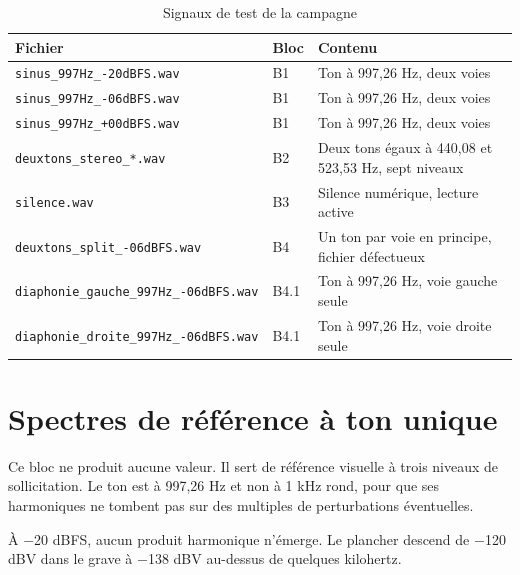 \begin{table}[H]
    \centering
    \caption{Signaux de test de la campagne}
    \label{tab:imd_signaux}
    \small
    \begin{tabular}{llp{}}
        \toprule
        Fichier                                        & Bloc & Contenu                                             \\
        \midrule
        \texttt{sinus\_997Hz\_-20dBFS.wav}             & B1   & Ton à 997,26 Hz, deux voies                         \\
        \texttt{sinus\_997Hz\_-06dBFS.wav}             & B1   & Ton à 997,26 Hz, deux voies                         \\
        \texttt{sinus\_997Hz\_+00dBFS.wav}             & B1   & Ton à 997,26 Hz, deux voies                         \\
        \texttt{deuxtons\_stereo\_*.wav}               & B2   & Deux tons égaux à 440,08 et 523,53 Hz, sept niveaux \\
        \texttt{silence.wav}                           & B3   & Silence numérique, lecture active                   \\
        \texttt{deuxtons\_split\_-06dBFS.wav}          & B4   & Un ton par voie en principe, fichier défectueux     \\
        \texttt{diaphonie\_gauche\_997Hz\_-06dBFS.wav} & B4.1 & Ton à 997,26 Hz, voie gauche seule                  \\
        \texttt{diaphonie\_droite\_997Hz\_-06dBFS.wav} & B4.1 & Ton à 997,26 Hz, voie droite seule                  \\
        \bottomrule
    \end{tabular}
\end{table}

\section{Spectres de référence à ton unique}
\label{ann:imd:b1}

Ce bloc ne produit aucune valeur. Il sert de référence visuelle à trois niveaux de sollicitation. Le ton est à 997,26 Hz et non à 1 kHz rond, pour que ses harmoniques ne tombent pas sur des multiples de perturbations éventuelles.


À $-$20 dBFS, aucun produit harmonique n'émerge. Le plancher descend de $-$120 dBV dans le grave à $-$138 dBV au-dessus de quelques kilohertz.

